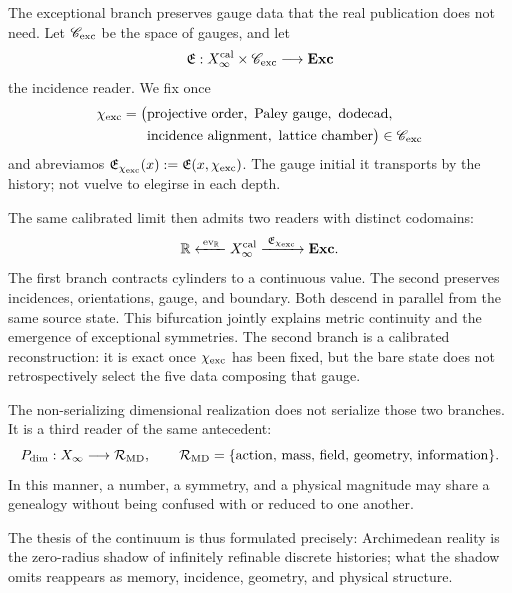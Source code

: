 {The exceptional branch preserves gauge data that the real publication does not
need. Let \(\mathscr C_{\rm exc}\) be the space of gauges, and let
\begin{equation}
\mathfrak E:
X_\infty^{\rm cal}\times\mathscr C_{\rm exc}
\longrightarrow\mathbf{Exc}
\label{p12-83-c3-s1:eq:exceptional-calibrated-reader}
\end{equation}
the incidence reader. We fix once
\begin{equation}
\begin{aligned}
\chi_{\rm exc}=\bigl(&\text{projective order},\ \text{Paley gauge},
 \ \text{dodecad},\\
 &\text{incidence alignment},\ \text{lattice chamber}\bigr)
 \in\mathscr C_{\rm exc}
\end{aligned}
\label{p12-83-c3-s1:eq:exceptional-calibration}
\end{equation}
and abreviamos
\(\mathfrak E_{\chi_{\rm exc}}(x):=\mathfrak E(x,\chi_{\rm exc})\).
The gauge initial it transports by the history; not vuelve to elegirse in
each depth.

The same calibrated limit then admits two readers with distinct codomains:
\begin{equation}
\mathbb R
\xleftarrow{\;\operatorname{ev}_{\mathbb R}\;}
X_\infty^{\rm cal}
\xrightarrow{\;\mathfrak E_{\chi_{\rm exc}}\;}
\mathbf{Exc}.
\label{p12-83-c3-s1:eq:double-projection}
\end{equation}
The first branch contracts cylinders to a continuous value. The second
preserves incidences, orientations, gauge, and boundary. Both descend in
parallel from the same source state. This bifurcation jointly explains
metric continuity and the emergence of exceptional symmetries. The second
branch is a calibrated reconstruction: it is exact once
\(\chi_{\rm exc}\) has been fixed, but the bare state does not retrospectively select
the five data composing that gauge.

The non-serializing dimensional realization does not serialize those two branches. It is a third reader of the same antecedent:
\begin{equation}
P_{\rm dim}:X_\infty\longrightarrow
\mathcal R_{\rm MD},
\qquad
\mathcal R_{\rm MD}=
\{\text{action, mass, field, geometry, information}\}.
\label{p12-83-c3-s1:eq:dimensional-publication}
\end{equation}
In this manner, a number, a symmetry, and a physical magnitude may share a
genealogy without being confused with or reduced to one another.

The thesis of the continuum is thus formulated precisely: Archimedean
reality is the zero-radius shadow of infinitely refinable discrete histories;
what the shadow omits reappears as memory, incidence,
geometry, and physical structure.

\begin{HMTScientificOwnerSubordinated}

\end{HMTScientificOwnerSubordinated}
}

